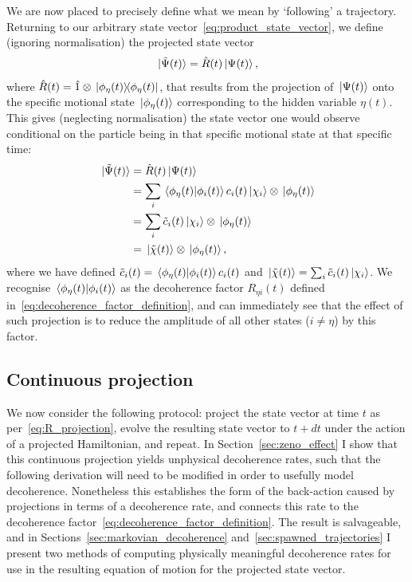 We are now placed to precisely define what we mean by `following' a trajectory.
Returning to our arbitrary state vector~\eqref{eq:product_state_vector}, we define (ignoring normalisation) the projected state vector
\begin{align}\label{eq:R_projection}
\ket{\tilde \Psi(t)} = \hat R(t)\ket{\Psi(t)},
\end{align}
where $\hat R(t) = \hat 1 \otimes \ketbra{\phi_\eta(t)}{\phi_\eta(t)}$, that results from the projection of $\ket{\Psi(t)}$ onto the specific motional state $\ket{\phi_\eta(t)}$ corresponding to the hidden variable $\eta(t)$. This gives (neglecting normalisation) the state vector one would observe conditional on the particle being in that specific motional state at that specific time:
\begin{align}
\ket{\tilde \Psi(t)} &= \hat R(t) \ket{\Psi(t)}\\
&= \sum_i\braket{\phi_\eta(t)}{\phi_i(t)}c_i(t)\ket{\chi_i}\otimes\ket{\phi_\eta(t)}\\
&= \sum_i\tilde c_i(t)\ket{\chi_i}\otimes\ket{\phi_\eta(t)}\\
&= \ket{\tilde \chi(t)}\otimes\ket{\phi_\eta(t)},
\end{align}
where we have defined $\tilde c_i(t) = \braket{\phi_\eta(t)}{\phi_i(t)}c_i(t)$ and $\ket{\tilde \chi(t)} = \sum_i \tilde c_i(t)\ket{\chi_i}$. We recognise $\braket{\phi_\eta(t)}{\phi_i(t)}$ as the decoherence factor $R_{\eta i}(t)$ defined in~\eqref{eq:decoherence_factor_definition}, and can immediately see that the effect of such projection is to reduce the amplitude of all other states ($i\neq\eta$) by this factor.

\subsection{Continuous projection}\label{sec:continuous_projection}
We now consider the following protocol: project the state vector at time $t$ as per~\eqref{eq:R_projection}, evolve the resulting state vector to $t+dt$ under the action of a projected Hamiltonian, and repeat. In Section~\ref{sec:zeno_effect} I show that this continuous projection yields unphysical decoherence rates, such that the following derivation will need to be modified in order to usefully model decoherence. Nonetheless this establishes the form of the back-action caused by projections in terms of a decoherence rate, and connects this rate to the decoherence factor~\eqref{eq:decoherence_factor_definition}. The result is salvageable, and in Sections~\ref{sec:markovian_decoherence} and~\ref{sec:spawned_trajectories} I present two methods of computing physically meaningful decoherence rates for use in the resulting equation of motion for the projected state vector.

